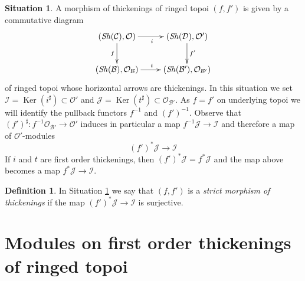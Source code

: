 \documentclass{stacks-project}
\theoremstyle{plain}
\theoremstyle{definition}
\newtheorem{definition}[subsection]{Definition}
\newtheorem{situation}[subsection]{Situation}
\theoremstyle{remark}
\numberwithin{equation}{subsection}
\def\Sh{\mathop{\mathit{Sh}}\nolimits}
\def\Ker{\mathop{\mathrm{Ker}}}
\begin{document}
\begin{situation}
\label{situation-morphism-thickenings-ringed-topoi}
A morphism of thickenings of ringed topoi $(f, f')$
is given by a commutative diagram
\begin{equation}
\label{equation-morphism-thickenings-ringed-topoi}
\vcenter{
\xymatrix{
(\Sh(\mathcal{C}), \mathcal{O}) \ar[r]_i \ar[d]_f &
(\Sh(\mathcal{D}), \mathcal{O}') \ar[d]^{f'} \\
(\Sh(\mathcal{B}), \mathcal{O}_\mathcal{B}) \ar[r]^t &
(\Sh(\mathcal{B}'), \mathcal{O}_{\mathcal{B}'})
}
}
\end{equation}
of ringed topoi whose horizontal arrows are thickenings. In this
situation we set
$\mathcal{I} = \Ker(i^\sharp) \subset \mathcal{O}'$ and
$\mathcal{J} = \Ker(t^\sharp) \subset \mathcal{O}_{\mathcal{B}'}$.
As $f = f'$ on underlying topoi we will identify
the pullback functors $f^{-1}$ and $(f')^{-1}$.
Observe that
$(f')^\sharp : f^{-1}\mathcal{O}_{\mathcal{B}'} \to \mathcal{O}'$
induces in particular a map $f^{-1}\mathcal{J} \to \mathcal{I}$
and therefore a map of $\mathcal{O}'$-modules
$$
(f')^*\mathcal{J} \longrightarrow \mathcal{I}
$$
If $i$ and $t$ are first order thickenings, then
$(f')^*\mathcal{J} = f^*\mathcal{J}$ and the map above becomes a
map $f^*\mathcal{J} \to \mathcal{I}$.
\end{situation}

\begin{definition}
\label{definition-strict-morphism-thickenings-ringed-topoi}
In Situation \ref{situation-morphism-thickenings-ringed-topoi}
we say that $(f, f')$ is a {\it strict morphism of thickenings}
if the map $(f')^*\mathcal{J} \longrightarrow \mathcal{I}$ is surjective.
\end{definition}








\section{Modules on first order thickenings of ringed topoi}
\label{section-modules-thickenings-ringed-topoi}
\end{document}
